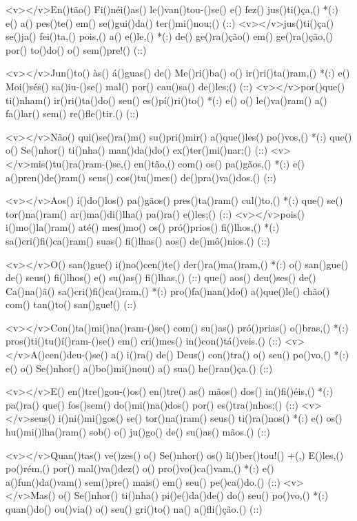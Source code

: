 <v></v>En()tão() Fi()néi()as() le()van()tou-()se() e() fez() jus()ti()ça,() *(:)
e() a() pes()te() em() se()gui()da() ter()mi()nou;() (::)
<v></v>jus()ti()ça() se()ja() fei()ta,() pois,() a() e()le,() *(:)
de() ge()ra()ção() em() ge()ra()ção,() por() to()do() o() sem()pre!() (::)

<v></v>Jun()to() às() á()guas() de() Me()ri()ba() o() ir()ri()ta()ram,() *(:)
e() Moi()sés() sa()iu-()se() mal() por() cau()sa() de()les;() (::)
<v></v>por()que() ti()nham() ir()ri()ta()do() seu() es()pí()ri()to() *(:)
e() o() le()va()ram() a() fa()lar() sem() re()fle()tir.() (::)

<v></v>Não() qui()se()ra()m() su()pri()mir() a()que()les() po()vos,() *(:)
que() o() Se()nhor() ti()nha() man()da()do() ex()ter()mi()nar;() (::)
<v></v>mis()tu()ra()ram-()se,() en()tão,() com() os() pa()gãos,() *(:)
e() a()pren()de()ram() seus() cos()tu()mes() de()pra()va()dos.() (::)

<v></v>Aos() í()do()los() pa()gãos() pres()ta()ram() cul()to,() *(:)
que() se() tor()na()ram() ar()ma()di()lha() pa()ra() e()les;() (::)
<v></v>pois() i()mo()la()ram() até() mes()mo() os() pró()prios() fi()lhos,() *(:)
sa()cri()fi()ca()ram() suas() fi()lhas() aos() de()mô()nios.() (::)

<v></v>O() san()gue() i()no()cen()te() der()ra()ma()ram,() *(:)
o() san()gue() de() seus() fi()lhos() e() su()as() fi()lhas,() (::)
que() aos() deu()ses() de() Ca()na()ã() sa()cri()fi()ca()ram,() *(:)
pro()fa()nan()do() a()que()le() chão() com() tan()to() san()gue!() (::)

<v></v>Con()ta()mi()na()ram-()se() com() su()as() pró()prias() o()bras,() *(:)
pros()ti()tu()í()ram-()se() em() cri()mes() in()con()tá()veis.() (::)
<v></v>A()cen()deu-()se() a() i()ra() de() Deus() con()tra() o() seu() po()vo,() *(:)
e() o() Se()nhor() a()bo()mi()nou() a() sua() he()ran()ça.() (::)

<v></v>E() en()tre()gou-()os() en()tre() as() mãos() dos() in()fi()éis,() *(:)
pa()ra() que() fos()sem() do()mi()na()dos() por() es()tra()nhos;() (::)
<v></v>seus() i()ni()mi()gos() se() tor()na()ram() seus() ti()ra()nos() *(:)
e() os() hu()mi()lha()ram() sob() o() ju()go() de() su()as() mãos.() (::)

<v></v>Quan()tas() ve()zes() o() Se()nhor() os() li()ber()tou!() +(,)
E()les,() po()rém,() por() mal()va()dez() o() pro()vo()ca()vam,() *(:)
e() a()fun()da()vam() sem()pre() mais() em() seu() pe()ca()do.() (::)
<v></v>Mas() o() Se()nhor() ti()nha() pi()e()da()de() do() seu() po()vo,() *(:)
quan()do() ou()via() o() seu() gri()to() na() a()fli()ção.() (::)

